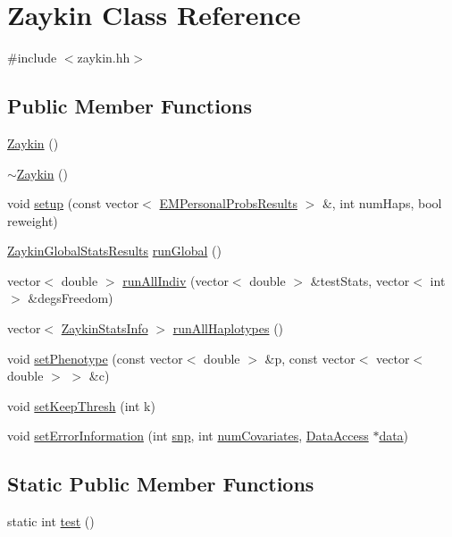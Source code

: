 \hypertarget{classZaykin}{
\section{Zaykin Class Reference}
\label{classZaykin}
}


{\ttfamily \#include $<$zaykin.hh$>$}

\subsection*{Public Member Functions}
\begin{DoxyCompactItemize}
\item 
\hyperlink{classZaykin_a63cb6e8305dab0de45215665b45259a3}{Zaykin} ()
\item 
\hyperlink{classZaykin_a29f455c179a9dddc260fc6a580be2611}{$\sim$Zaykin} ()
\item 
void \hyperlink{classZaykin_a8f1f7c88b1f685b6d76b221e5fabe1d5}{setup} (const vector$<$ \hyperlink{structEMPersonalProbsResults}{EMPersonalProbsResults} $>$ \&, int numHaps, bool reweight)
\item 
\hyperlink{classZaykinGlobalStatsResults}{ZaykinGlobalStatsResults} \hyperlink{classZaykin_a61d28f9390301515bd9a47f8e6d631fb}{runGlobal} ()
\item 
vector$<$ double $>$ \hyperlink{classZaykin_a5afe5c8d000df0e1dce66d4a22891623}{runAllIndiv} (vector$<$ double $>$ \&testStats, vector$<$ int $>$ \&degsFreedom)
\item 
vector$<$ \hyperlink{classZaykinStatsInfo}{ZaykinStatsInfo} $>$ \hyperlink{classZaykin_af949cdfef60f62921b1128017c2dcc1d}{runAllHaplotypes} ()
\item 
void \hyperlink{classZaykin_afaa2e550bb5c905c428efc59dcef97f1}{setPhenotype} (const vector$<$ double $>$ \&p, const vector$<$ vector$<$ double $>$ $>$ \&c)
\item 
void \hyperlink{classZaykin_a61bed374552233240a4cd9e6df612976}{setKeepThresh} (int k)
\item 
void \hyperlink{classZaykin_a4bc760635a1333aedbc911244d543dc6}{setErrorInformation} (int \hyperlink{classZaykin_a03181d0afbfb93c0206e5c679561cafb}{snp}, int \hyperlink{classZaykin_ad0b5f025c5cffe4ef14f1685e956faa5}{numCovariates}, \hyperlink{classDataAccess}{DataAccess} $\ast$\hyperlink{classZaykin_a08bb927fb1ddebabaa02cfc3fe3c21b2}{data})
\end{DoxyCompactItemize}
\subsection*{Static Public Member Functions}
\begin{DoxyCompactItemize}
\item 
static int \hyperlink{classZaykin_ac26fd52252bbba304828e69e44d0a909}{test} ()
\end{DoxyCompactItemize}
